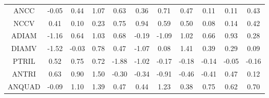 \begin{longtable}{ | c || c | c | c | c | c | c | c | c | c || c |}
ANCC &  \cellcolor[HTML]{FFFFFF} -0.05 &  \cellcolor[HTML]{F7F7FF} 0.44 &  \cellcolor[HTML]{E7E7FF} 1.07 &  \cellcolor[HTML]{EFEFFF} 0.63 &  \cellcolor[HTML]{F7F7FF} 0.36 &  \cellcolor[HTML]{EFEFFF} 0.71 &  \cellcolor[HTML]{F7F7FF} 0.47 &  \cellcolor[HTML]{FFFFFF} 0.11 &  \cellcolor[HTML]{FFFFFF} 0.11 &  \cellcolor[HTML]{F7F7FF} 0.43 \\
NCCV &  \cellcolor[HTML]{F7F7FF} 0.41 &  \cellcolor[HTML]{FFFFFF} 0.10 &  \cellcolor[HTML]{F7F7FF} 0.23 &  \cellcolor[HTML]{EFEFFF} 0.75 &  \cellcolor[HTML]{E7E7FF} 0.94 &  \cellcolor[HTML]{EFEFFF} 0.59 &  \cellcolor[HTML]{EFEFFF} 0.50 &  \cellcolor[HTML]{FFFFFF} 0.08 &  \cellcolor[HTML]{FFFFFF} 0.14 &  \cellcolor[HTML]{F7F7FF} 0.42 \\
ADIAM &  \cellcolor[HTML]{FFDFDF} -1.16 &  \cellcolor[HTML]{EFEFFF} 0.64 &  \cellcolor[HTML]{E7E7FF} 1.03 &  \cellcolor[HTML]{EFEFFF} 0.68 &  \cellcolor[HTML]{FFF7F7} -0.19 &  \cellcolor[HTML]{FFE7E7} -1.09 &  \cellcolor[HTML]{E7E7FF} 1.02 &  \cellcolor[HTML]{EFEFFF} 0.66 &  \cellcolor[HTML]{E7E7FF} 0.93 &  \cellcolor[HTML]{F7F7FF} 0.28 \\
DIAMV &  \cellcolor[HTML]{FFD7D7} -1.52 &  \cellcolor[HTML]{FFFFFF} -0.03 &  \cellcolor[HTML]{EFEFFF} 0.78 &  \cellcolor[HTML]{F7F7FF} 0.47 &  \cellcolor[HTML]{FFE7E7} -1.07 &  \cellcolor[HTML]{FFFFFF} 0.08 &  \cellcolor[HTML]{DFDFFF} 1.41 &  \cellcolor[HTML]{F7F7FF} 0.39 &  \cellcolor[HTML]{F7F7FF} 0.29 &  \cellcolor[HTML]{FFFFFF} 0.09 \\
PTRIL &  \cellcolor[HTML]{EFEFFF} 0.52 &  \cellcolor[HTML]{EFEFFF} 0.75 &  \cellcolor[HTML]{EFEFFF} 0.72 &  \cellcolor[HTML]{FFCFCF} -1.88 &  \cellcolor[HTML]{FFE7E7} -1.02 &  \cellcolor[HTML]{FFF7F7} -0.17 &  \cellcolor[HTML]{FFF7F7} -0.18 &  \cellcolor[HTML]{FFFFFF} -0.14 &  \cellcolor[HTML]{FFFFFF} -0.05 &  \cellcolor[HTML]{FFF7F7} -0.16 \\
ANTRI &  \cellcolor[HTML]{EFEFFF} 0.63 &  \cellcolor[HTML]{E7E7FF} 0.90 &  \cellcolor[HTML]{D7D7FF} 1.50 &  \cellcolor[HTML]{FFF7F7} -0.30 &  \cellcolor[HTML]{FFF7F7} -0.34 &  \cellcolor[HTML]{FFE7E7} -0.91 &  \cellcolor[HTML]{FFF7F7} -0.46 &  \cellcolor[HTML]{FFF7F7} -0.41 &  \cellcolor[HTML]{F7F7FF} 0.47 &  \cellcolor[HTML]{FFFFFF} 0.12 \\
ANQUAD &  \cellcolor[HTML]{FFFFFF} -0.09 &  \cellcolor[HTML]{E7E7FF} 1.10 &  \cellcolor[HTML]{DFDFFF} 1.39 &  \cellcolor[HTML]{F7F7FF} 0.47 &  \cellcolor[HTML]{F7F7FF} 0.44 &  \cellcolor[HTML]{DFDFFF} 1.23 &  \cellcolor[HTML]{F7F7FF} 0.38 &  \cellcolor[HTML]{EFEFFF} 0.75 &  \cellcolor[HTML]{EFEFFF} 0.62 &  \cellcolor[HTML]{EFEFFF} 0.70 \\

\end{longtable}
